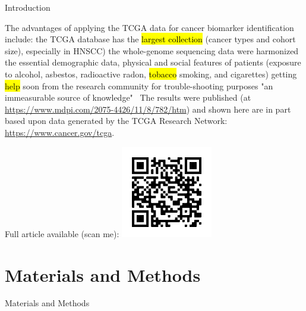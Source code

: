 \documentclass[paperwidth=78cm,paperheight=110cm,portrait]{baposter}
\begin{document}
\begin{poster}
\begin{posterbox}[name=intro,column=0,row=0]{Introduction}
\begin{outline}
\0 The advantages of applying the TCGA data for cancer biomarker identification include:
\1  the TCGA database has the \hl{largest collection} (cancer types and cohort size), especially in HNSCC)
\2 the whole-genome sequencing data were harmonized
\2 the essential demographic data, physical and social features of patients (exposure to alcohol, asbestos, radioactive radon, \hl{tobacco} smoking, and cigarettes)
\1 getting \hl{help} soon from the research community for trouble-shooting purposes
\1 "an immeasurable source of knowledge"~\cite{Tomczak2015}
\1 The results were published\cite{Chi2021} (at \url{https://www.mdpi.com/2075-4426/11/8/782/htm}) and shown here are in part based upon data generated by the TCGA Research Network: \url{https://www.cancer.gov/tcga}.
\end{outline}
\begin{center}
\footnotesize Full article available (scan me):
\includegraphics[width=0.3\textwidth]{QRcode_JPM-1309345.png}
\end{center}
\end{posterbox}

\section{Materials and Methods}
\begin{posterbox}[name=lists,column=0,below=intro, ,above=bottom]{Materials and Methods}

\begin{outline}


\end{outline}
\end{posterbox}
\end{poster}
\end{document}
